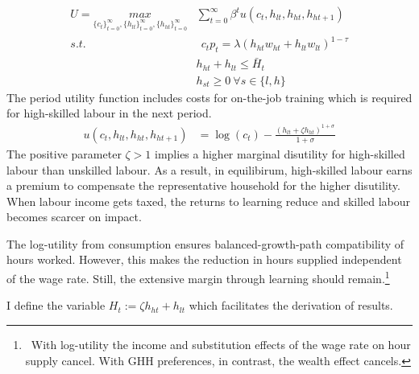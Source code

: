 \begin{align}
U=\underset{\{c_{t}\}_{t=0}^{\infty}, \{h_{lt}\}_{t=0}^{\infty}, \{h_{ht}\}_{t=0}^{\infty}}{max}&
\sum_{t=0}^{\infty}\beta^t u(c_{t}, h_{lt}, h_{ht}, h_{ht+1})\\
s.t.& \ \ c_{t}p_{t}=%
\lambda \left(h_{ht}w_{ht}+h_{lt}w_{lt}\right)^{1-\tau}\\
\ & h_{ht}+h_{lt}\leq \bar{H}_t\\
\ & h_{st}\geq 0 \ \forall s\in \{l,h\}
\end{align}
The period utility function includes costs for on-the-job training which is required for high-skilled labour in the next period. 
\begin{align}
	u(c_{t}, h_{lt}, h_{ht}, h_{ht+1})&= %
	\log(c_t)-\frac{(h_{lt}+\zeta h_{ht})^{1+\sigma}}{1+\sigma}%
\end{align}
The positive parameter $\zeta>1$ implies a higher marginal disutility for high-skilled labour than unskilled labour. As a result, in equilibirum,  
high-skilled labour earns a premium to compensate the representative household for the higher disutility. When labour income gets taxed, the returns to learning reduce and skilled labour becomes scarcer on impact. 

The log-utility from consumption ensures balanced-growth-path compatibility of hours worked. However, this makes the reduction in hours supplied independent of the wage rate. Still, the extensive margin through learning should remain.\footnote{\ \textcolor{sonja}{With log-utility the income and substitution effects of the wage rate on hour supply cancel. With GHH preferences, in contrast, the wealth effect cancels.} }

I define the variable $H_t:=\zeta h_{ht}+h_{lt}$ which facilitates the derivation of results. 

